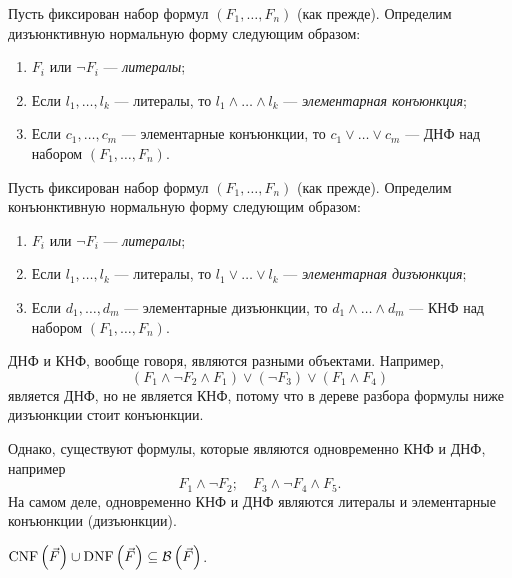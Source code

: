 \begin{definition}
    Пусть фиксирован набор формул $(F_{1}, \ldots, F_{n})$ (как прежде).
    Определим дизъюнктивную нормальную форму следующим образом:
    \begin{enumerate}
        \item $F_{i}$ или $\neg F_{i}$ --- {\it литералы};
        \item Если $l_{1}, \ldots, l_{k}$ --- литералы, то $l_{1} \land \ldots \land  l_{k}$ --- {\it элементарная конъюнкция};
        \item Если $c_{1}, \ldots, c_{m}$ --- элементарные конъюнкции, то $c_{1} \lor \ldots \lor c_{m}$ --- ДНФ над набором $(F_{1}, \ldots, F_{n})$.
    \end{enumerate}
\end{definition}

\begin{definition}
    Пусть фиксирован набор формул $(F_{1}, \ldots, F_{n})$ (как прежде).
    Определим конъюнктивную нормальную форму следующим образом:
    \begin{enumerate}
        \item $F_{i}$ или $\neg F_{i}$ --- {\it литералы};
        \item Если $l_{1}, \ldots, l_{k}$ --- литералы, то $l_{1} \lor \ldots \lor  l_{k}$ --- {\it элементарная дизъюнкция};
        \item Если $d_{1}, \ldots, d_{m}$ --- элементарные дизъюнкции, то $d_{1} \land \ldots \land d_{m}$ --- КНФ над набором $(F_{1}, \ldots, F_{n})$.
    \end{enumerate}
\end{definition}

ДНФ и КНФ, вообще говоря, являются разными объектами.
Например,
$$
    (F_{1} \land \neg F_{2} \land F_{1}) \lor (\neg F_{3}) \lor (F_{1} \land F_{4})
$$
является ДНФ, но не является КНФ, потому что в дереве разбора формулы ниже дизъюнкции стоит конъюнкции.

Однако, существуют формулы, которые являются одновременно КНФ и ДНФ, например
$$
    F_{1} \land \neg F_{2}; \quad F_{3} \land \neg F_{4} \land F_{5}.
$$
На самом деле, одновременно КНФ и ДНФ являются литералы и элементарные конъюнкции (дизъюнкции).

\begin{corollary}
    $\operatorname{CNF}\left(\vec{F}\right) \cup \operatorname{DNF}\left(\vec{F}\right) \subseteq \mathcal{B}\left(\vec{F}\right)$.
\end{corollary}
